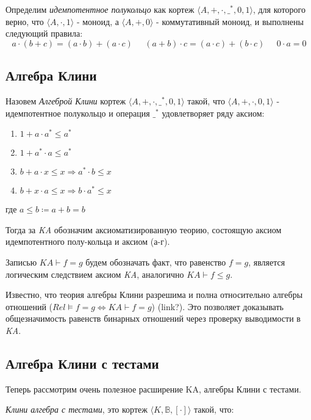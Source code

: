 \documentclass[times
              ]{itmo-student-thesis}
\begin{document}
      Определим \textit{идемпотентное полукольцо} как кортеж $ \langle A,+,\cdot,\_^*,0,1 \rangle$, для которого верно, что
      $ \langle A, \cdot, 1 \rangle $ - моноид,
      а $ \langle A, +, 0 \rangle $ - коммутативный моноид, и выполнены следующий правила:
      $$ a \cdot (b + c) = (a \cdot b) + (a \cdot c) \;\;\;\;\;
         (a + b) \cdot c = (a \cdot c) + (b \cdot c) \;\;\;\;\;
         0 \cdot a = 0
      $$

    \subsection{Алгебра Клини}
      Назовем \textit{Алгеброй Клини} кортеж $\langle A,+,\cdot,\_^*,0,1\rangle$ такой, что $\langle A, +, \cdot, 0, 1 \rangle$ - идемпотентное полукольцо и операция $ \_^* $ удовлетворяет ряду аксиом:
      \begin{enumerate}
        \item $ 1 + a \cdot a^* \leq a^* $
        \item $ 1 + a^* \cdot a \leq a^* $
        \item $ b + a \cdot x \leq x \Rightarrow a^* \cdot b \leq x $
        \item $ b + x \cdot a \leq x \Rightarrow b \cdot a^* \leq x $
      \end{enumerate}
      где  $ a \leq b \coloneqq a + b = b$

      Тогда за \textit{KA} обозначим аксиоматизированную теорию, состоящую аксиом идемпотентного полу-кольца и аксиом (а-г).

      Записью $ \mathit{KA} \vdash f = g $ будем обозначать факт, что равенство $ f = g $, является логическим следствием аксиом \textit{KA},
      аналогично $ \mathit{KA} \vdash f \leq g $.

      Известно, что теория алгебры Клини разрешима и полна относительно алгебры отношений
      ($ Rel \models f = g \Leftrightarrow \mathit{KA} \vdash f = g$) (link?).
      Это позволяет доказывать общезначимость равенств бинарных отношений через проверку выводимости в \textit{KA}.

    \subsection{Алгебра Клини с тестами}
      Теперь рассмотрим очень полезное расширение KA, алгебры Клини с тестами.

      \textit{Клини алгебра с тестами}, это кортеж $\langle K,\mathbb{B}, [\cdot] \rangle$ такой, что:
\end{document}
